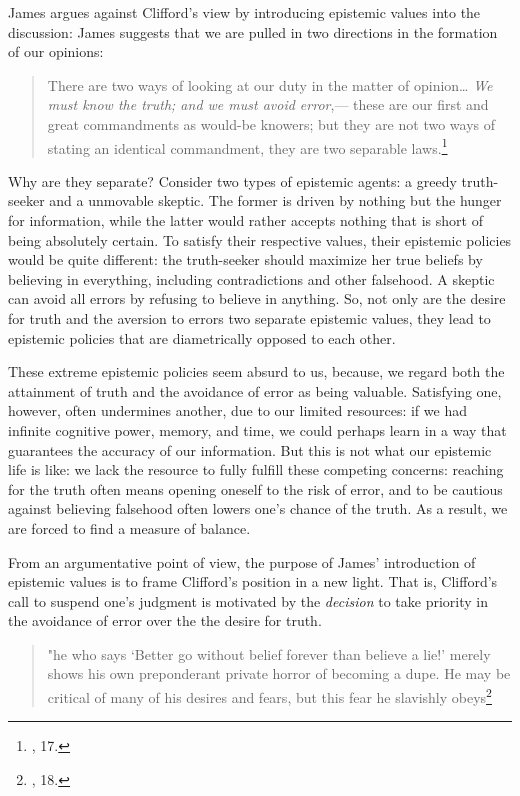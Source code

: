 James argues against Clifford's view by introducing epistemic values
into the discussion: James suggests that we are pulled in two directions
in the formation of our opinions:

\begin{quote}
There are two ways of looking at our duty in the matter of
opinion\ldots{} \emph{We must know the truth; and we must avoid
error},--- these are our first and great commandments as would-be
knowers; but they are not two ways of stating an identical commandment,
they are two separable laws.\footnote{\cite{jameswill}, 17.}
\end{quote}

Why are they separate? Consider two types of epistemic agents: a greedy
truth-seeker and a unmovable skeptic. The former is driven by nothing
but the hunger for information, while the latter would rather accepts
nothing that is short of being absolutely certain. To satisfy their
respective values, their epistemic policies would be quite different:
the truth-seeker should maximize her true beliefs by believing in
everything, including contradictions and other falsehood. A skeptic can
avoid all errors by refusing to believe in anything. So, not only are
the desire for truth and the aversion to errors two separate epistemic
values, they lead to epistemic policies that are diametrically opposed
to each other.

These extreme epistemic policies seem absurd to us, because, we regard
both the attainment of truth and the avoidance of error as being
valuable. Satisfying one, however, often undermines another, due to our
limited resources: if we had infinite cognitive power, memory, and time,
we could perhaps learn in a way that guarantees the accuracy of our
information. But this is not what our epistemic life is like: we lack
the resource to fully fulfill these competing concerns: reaching for the
truth often means opening oneself to the risk of error, and to be
cautious against believing falsehood often lowers one's chance of the
truth. As a result, we are forced to find a measure of balance.

From an argumentative point of view, the purpose of James' introduction
of epistemic values is to frame Clifford's position in a new light. That
is, Clifford's call to suspend one's judgment is motivated by the
\emph{decision} to take priority in the avoidance of error over the the
desire for truth.

\begin{quote}
"he who says `Better go without belief forever than believe a lie!'
merely shows his own preponderant private horror of becoming a dupe. He
may be critical of many of his desires and fears, but this fear he
slavishly obeys\footnote{\cite{jameswill}, 18.}
\end{quote}

